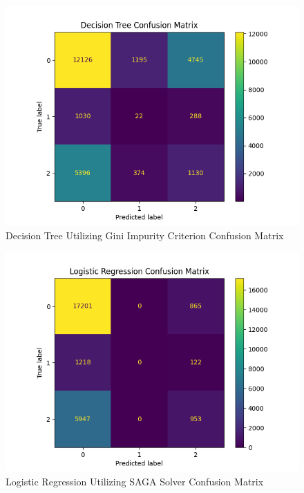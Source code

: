 \documentclass[journal]{IEEEtran}
\begin{document}
\begin{figure}[h!]
\includegraphics[scale=0.5]{Decision Tree_cm.png}
\centering
\caption{Decision Tree Utilizing Gini Impurity Criterion Confusion Matrix}
\label{fig:dtree}
\end{figure}

\begin{figure}[h!]
    \includegraphics[scale=0.5]{Logistic Regression_cm.png}
    \centering
    \caption{Logistic Regression Utilizing SAGA Solver Confusion Matrix}
    \label{fig:logreg}
    \end{figure}
\end{document}
